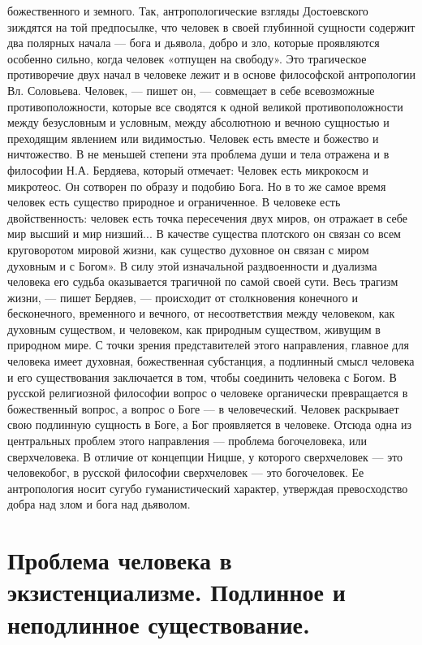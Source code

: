 \documentclass[12pt]{article}
\begin{document}
божественного и земного. Так, антропологические взгляды Достоевского зиждятся на той предпосылке, что
человек в своей глубинной сущности содержит два полярных начала — бога и дьявола, добро и зло, которые
проявляются особенно сильно, когда человек «отпущен на свободу».
Это трагическое противоречие двух начал в человеке лежит и в основе философской антропологии Вл.
Соловьева.
Человек, — пишет он, — совмещает в себе всевозможные противоположности, которые все сводятся к одной
великой противоположности между безусловным и условным, между абсолютною и вечною сущностью и
преходящим явлением или видимостью. Человек есть вместе и божество и ничтожество.
В не меньшей степени эта проблема души и тела отражена и в философии Н.А. Бердяева, который отмечает:
Человек есть микрокосм и микротеос. Он сотворен по образу и подобию Бога. Но в то же самое время человек
есть существо природное и ограниченное. В человеке есть двойственность: человек есть точка пересечения
двух миров, он отражает в себе мир высший и мир низший... В качестве существа плотского он связан со всем
круговоротом мировой жизни, как существо духовное он связан с миром духовным и с Богом».
В силу этой изначальной раздвоенности и дуализма человека его судьба оказывается трагичной по самой своей
сути.
Весь трагизм жизни, — пишет Бердяев, — происходит от столкновения конечного и бесконечного, временного и
вечного, от несоответствия между человеком, как духовным существом, и человеком, как природным
существом, живущим в природном мире.
С точки зрения представителей этого направления, главное для человека имеет духовная, божественная
субстанция, а подлинный смысл человека и его существования заключается в том, чтобы соединить человека с
Богом. В русской религиозной философии вопрос о человеке органически превращается в божественный
вопрос, а вопрос о Боге — в человеческий. Человек раскрывает свою подлинную сущность в Боге, а Бог
проявляется в человеке. Отсюда одна из центральных проблем этого направления — проблема богочеловека,
или сверхчеловека. В отличие от концепции Ницше, у которого сверхчеловек — это человекобог, в русской
философии сверхчеловек — это богочеловек. Ее антропология носит сугубо гуманистический характер,
утверждая превосходство добра над злом и бога над дьяволом.


\newpage
\section{Проблема человека в экзистенциализме. Подлинное и неподлинное существование.}
\end{document}
